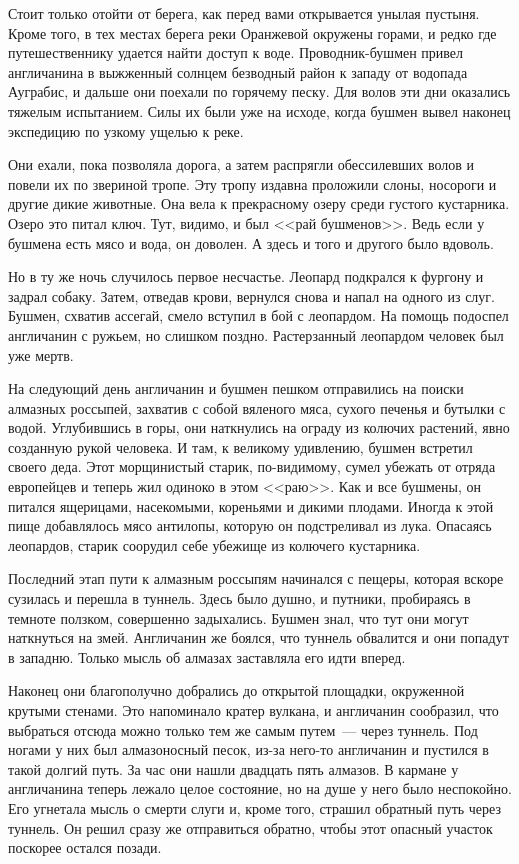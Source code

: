 \documentclass[12pt,a4paper,twoside,openany,svgnames]{memoir}
\begin{document}
Стоит только отойти от берега, как перед вами открывается унылая пустыня. Кроме того, в тех местах берега реки Оранжевой окружены горами, и редко где путешественнику удается найти доступ к воде. Проводник-бушмен привел англичанина в выжженный солнцем безводный район к западу от водопада Ауграбис, и дальше они поехали по горячему песку. Для волов эти дни оказались тяжелым испытанием. Силы их были уже на исходе, когда бушмен вывел наконец экспедицию по узкому ущелью к реке.

Они ехали, пока позволяла дорога, а затем распрягли обессилевших волов и повели их по звериной тропе. Эту тропу издавна проложили слоны, носороги и другие дикие животные. Она вела к прекрасному озеру среди густого кустарника. Озеро это питал ключ. Тут, видимо, и был <<рай бушменов>>. Ведь если у бушмена есть мясо и вода, он доволен. А здесь и того и другого было вдоволь.

Но в ту же ночь случилось первое несчастье. Леопард подкрался к фургону и задрал собаку. Затем, отведав крови, вернулся снова и напал на одного из слуг. Бушмен, схватив ассегай, смело вступил в бой с леопардом. На помощь подоспел англичанин с ружьем, но слишком поздно. Растерзанный леопардом человек был уже мертв.

На следующий день англичанин и бушмен пешком отправились на поиски алмазных россыпей, захватив с собой вяленого мяса, сухого печенья и бутылки с водой. Углубившись в горы, они наткнулись на ограду из колючих растений, явно созданную рукой человека. И там, к великому удивлению, бушмен встретил своего деда. Этот морщинистый старик, по-видимому, сумел убежать от отряда европейцев и теперь жил одиноко в этом <<раю>>. Как и все бушмены, он питался ящерицами, насекомыми, кореньями и дикими плодами. Иногда к этой пище добавлялось мясо антилопы, которую он подстреливал из лука. Опасаясь леопардов, старик соорудил себе убежище из колючего кустарника.

Последний этап пути к алмазным россыпям начинался с пещеры, которая вскоре сузилась и перешла в туннель. Здесь было душно, и путники, пробираясь в темноте ползком, совершенно задыхались. Бушмен знал, что тут они могут наткнуться на змей. Англичанин же боялся, что туннель обвалится и они попадут в западню. Только мысль об алмазах заставляла его идти вперед.

Наконец они благополучно добрались до открытой площадки, окруженной крутыми стенами. Это напоминало кратер вулкана, и англичанин сообразил, что выбраться отсюда можно только тем же самым путем~--- через туннель. Под ногами у них был алмазоносный песок, из-за него-то англичанин и пустился в такой долгий путь. За час они нашли двадцать пять алмазов. В кармане у англичанина теперь лежало целое состояние, но на душе у него было неспокойно. Его угнетала мысль о смерти слуги и, кроме того, страшил обратный путь через туннель. Он решил сразу же отправиться обратно, чтобы этот опасный участок поскорее остался позади.
\end{document}
